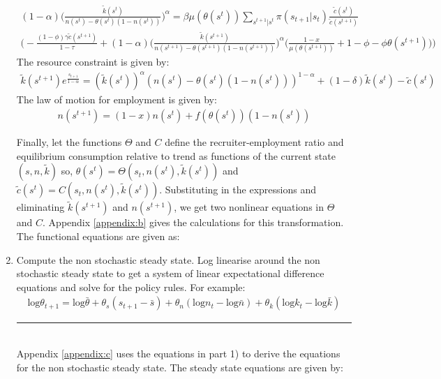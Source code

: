 \documentclass[11pt,letterpaper]{article}
\newcommand{\Hline}{\noindent\rule{17cm}{0.5pt}}
\begin{document}
\begin{enumerate}
\begin{align*}
  (1-\alpha) \bigg(\frac{\tilde{k}(s^t)}{n(s^t) -
  \theta(s^t)(1-n(s^t))} \bigg)^{\alpha} = \beta \mu(\theta(s^t))
  \sum_{s^{t+1}|s^t} \pi(s_{t+1}|s_t)
  \frac{\tilde{c}(s^t)}{\tilde{c}(s^{t+1})}\\ \bigg(-
  \frac{(1-\phi)\gamma \tilde{c}(s^{t+1})}{1-\tau} + (1-\alpha) \bigg(
  \frac{\tilde{k}(s^{t+1})}{n(s^{t+1}) - \theta(s^{t+1})(1-n(s^{t+1}))}
  \bigg)^{\alpha} \bigg(\frac{1-x}{\mu(\theta(s^{t+1}))} + 1 -\phi -
  \phi \theta(s^{t+1}) \bigg)\bigg)
\end{align*}
The resource constraint is given by:
\begin{align*}
  \tilde{k}(s^{t+1}) e^{\frac{s_{t+1}}{1-\alpha}} =
  (\tilde{k}(s^t))^{\alpha} (n(s^t) - \theta(s^t)(1-n(s^t)))^{1-\alpha}
  + (1-\delta) \tilde{k}(s^t) -\tilde{c}(s^t)
\end{align*}
The law of motion for employment is given by:
\begin{align*}
  n(s^{t+1}) = (1-x) n(s^t) + f(\theta(s^t))(1-n(s^t))
\end{align*}

Finally, let the functions $\Theta$ and $C$ define the
recruiter-employment ratio and equilibrium consumption relative to
trend as functions of the current state $(s,n,\tilde{k})$ so,
$\theta(s^t) = \Theta(s_t, n(s^t), \tilde{k}(s^t))$ and
$\tilde{c}(s^t) = C(s_t, n(s^t), \tilde{k}(s^t))$. Substituting in the
expressions and eliminating $\tilde{k}(s^{t+1})$ and $n(s^{t+1})$, we
get two nonlinear equations in $\Theta$ and $C$. Appendix
\ref{appendix:b} gives the calculations for this transformation. The
functional equations are given as:

\item Compute the non stochastic steady state. Log linearise around
  the non stochastic steady state to get a system of linear
  expectational difference equations and solve for the policy
  rules. For example:
  \begin{align*}
    \text{log}\theta_{t+1} = \text{log}\bar{\theta} + \theta_s
    (s_{t+1}-\bar{s}) + \theta_n (\text{log}n_t - \text{log}\bar{n}) +
    \theta_k (\text{log}k_t - \text{log}\bar{k})
  \end{align*}
\Hline \\
Appendix \ref{appendix:c} uses the equations in part 1) to derive the
equations for the non stochastic steady state. The steady state
equations are given by:


\end{enumerate}
\end{document}
